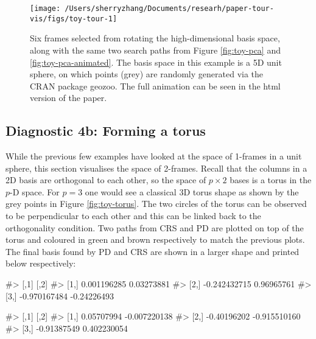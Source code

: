 \begin{Schunk}
\begin{figure}

{\centering \texttt{[image: /Users/sherryzhang/Documents/researh/paper-tour-vis/figs/toy-tour-1]} 

}

\caption{Six frames selected from rotating the high-dimensional basis space, along with the same two search paths from Figure \ref{fig:toy-pca} and \ref{fig:toy-pca-animated}. The basis space in this example is a 5D unit sphere, on which points (grey) are randomly generated via the CRAN package geozoo. The full animation can be seen in the html version of the paper.}\label{fig:toy-tour}
\end{figure}
\end{Schunk}

\hypertarget{diagnostic-4b-forming-a-torus}{%
\subsection{Diagnostic 4b: Forming a
torus}\label{diagnostic-4b-forming-a-torus}}

While the previous few examples have looked at the space of 1-frames in
a unit sphere, this section visualises the space of 2-frames. Recall
that the columns in a 2D basis are orthogonal to each other, so the
space of \(p \times 2\) bases is a torus in the \(p\)-D space. For
\(p = 3\) one would see a classical 3D torus shape as shown by the grey
points in Figure \ref{fig:toy-torus}. The two circles of the torus can
be observed to be perpendicular to each other and this can be linked
back to the orthogonality condition. Two paths from CRS and PD are
plotted on top of the torus and coloured in green and brown respectively
to match the previous plots. The final basis found by PD and CRS are
shown in a larger shape and printed below respectively:

\begin{Schunk}
\begin{Soutput}
#>              [,1]        [,2]
#> [1,]  0.001196285  0.03273881
#> [2,] -0.242432715  0.96965761
#> [3,] -0.970167484 -0.24226493
\end{Soutput}
\end{Schunk}

\begin{Schunk}
\begin{Soutput}
#>             [,1]         [,2]
#> [1,]  0.05707994 -0.007220138
#> [2,] -0.40196202 -0.915510160
#> [3,] -0.91387549  0.402230054
\end{Soutput}
\end{Schunk}

